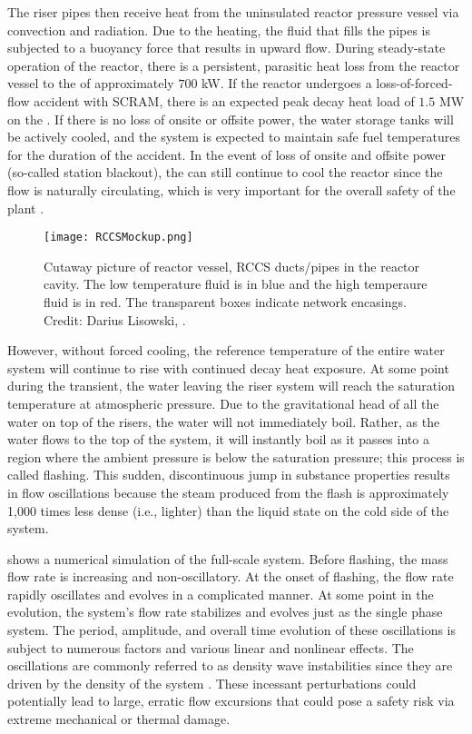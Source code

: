 The riser pipes then receive heat from the uninsulated reactor pressure vessel via convection and radiation.
Due to the heating, the fluid that fills the pipes is subjected to a buoyancy force that results in upward flow.
During steady-state operation of the reactor, there is a persistent, parasitic heat loss from the reactor vessel to the  of approximately $700$ kW.
If the reactor undergoes a loss-of-forced-flow accident with SCRAM, there is an expected peak decay heat load of $1.5$ MW on the .
If there is no loss of onsite or offsite power, the  water storage tanks will be actively cooled, and the system is expected to maintain safe fuel temperatures for the duration of the accident.
In the event of loss of onsite and offsite power (so-called station blackout), the  can still continue to cool the reactor since the flow is naturally circulating, which is very important for the overall safety of the plant \cite[]{nuclearregulatorycomminission_us_2007}.

\begin{figure}%
\centering
    \caption[RCCS near-reactor-riser system]{   Cutaway picture of reactor vessel, RCCS ducts/pipes in the reactor cavity.  
                The low temperature fluid is in blue and the high temperaure fluid is in red.  
                The transparent boxes indicate network encasings. 
                Credit: Darius Lisowski, \TheUniversity.}%
    \label{Figure:RCCSMockup}%
    \texttt{[image: RCCSMockup.png]}%
\end{figure}

However, without forced cooling, the reference temperature of the entire water system will continue to rise with continued decay heat exposure.
At some point during the transient, the water leaving the riser system will reach the saturation temperature at atmospheric pressure.  
Due to the gravitational head of all the water on top of the risers, the water will not immediately boil.
Rather, as the water flows to the top of the system, it will instantly boil as it passes into a region where the ambient pressure is below the saturation pressure; this process is called flashing.
This sudden, discontinuous jump in substance properties results in flow oscillations because the steam produced from the flash is approximately 1,000 times less dense (i.e., lighter) than the liquid state on the cold side of the system.

 shows a numerical simulation of the full-scale system.
Before flashing, the mass flow rate is increasing and non-oscillatory.
At the onset of flashing, the flow rate rapidly oscillates and evolves in a complicated manner.
At some point in the evolution, the system's flow rate stabilizes and evolves just as the single phase system.
The period, amplitude, and overall time evolution of these oscillations is subject to numerous factors and various linear and nonlinear effects.
The oscillations are commonly referred to as density wave instabilities since they are driven by the density of the system \cite{achard_analysis_1985}.
These incessant perturbations could potentially lead to large, erratic flow excursions that could pose a safety risk 
via extreme mechanical or thermal damage.

